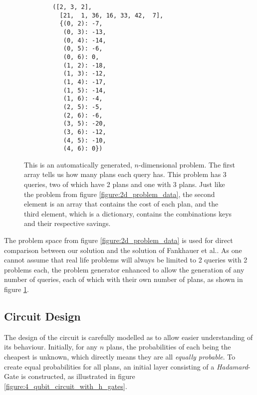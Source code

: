\begin{figure}[!h]
    \centering
    \begin{verbatim}
        ([2, 3, 2],
          [21,  1, 36, 16, 33, 42,  7],
          {(0, 2): -7,
           (0, 3): -13,
           (0, 4): -14,
           (0, 5): -6,
           (0, 6): 0,
           (1, 2): -18,
           (1, 3): -12,
           (1, 4): -17,
           (1, 5): -14,
           (1, 6): -4,
           (2, 5): -5,
           (2, 6): -6,
           (3, 5): -20,
           (3, 6): -12,
           (4, 5): -10,
           (4, 6): 0})
    \end{verbatim}
    \caption{This is an automatically generated, $n$-dimensional problem. The first array tells us how many plans each query has. This problem has 3 queries, two of which have 2 plans and one with 3 plans. Just like the problem from figure \ref{figure:2d_problem_data}, the second element is an array that contains the cost of each plan, and the third element, which is a dictionary, contains the combinations keys and their respective savings.}
    \label{figure:nd_problem_data}
\end{figure}

The problem space from figure \ref{figure:2d_problem_data} is used for direct comparison between our solution and the solution of Fankhauer et al.\cite{fankhauser_multiple_2021}. As one cannot assume that real life problems will always be limited to 2 queries with 2 problems each, the problem generator enhanced to allow the generation of any number of queries, each of which with their own number of plans, as shown in figure \ref{figure:nd_problem_data}.

\newpage

\subsection{Circuit Design}

The design of the circuit is carefully modelled as to allow easier understanding of its behaviour. Initially, for any $n$ plans, the probabilities of each being the cheapest is unknown, which directly means they are all \emph{equally probable}. To create equal probabilities for all plans, an initial layer consisting of a \emph{Hadamard}-Gate is constructed, as illustrated in figure \ref{figure:4_qubit_circuit_with_h_gates}.

